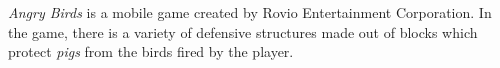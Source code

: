 \documentclass[sigconf]{acmart}
\begin{document}
\textit{Angry Birds} is a mobile game created by Rovio 
Entertainment 
Corporation\cite{angry-birds}. %
In the game, there is a variety of defensive structures made out of
blocks which protect {\em pigs} 
from the birds fired by the player. %
\end{document}
